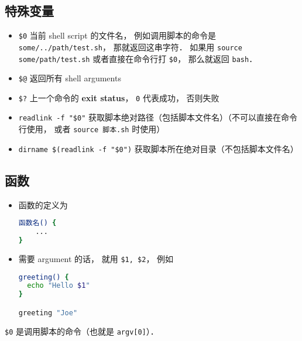 \subsection{特殊变量}
\begin{itemize}
\item \verb`$0` 当前 shell script 的文件名， 例如调用脚本的命令是 \verb|some/../path/test.sh|， 那就返回这串字符． 如果用 \verb|source some/path/test.sh| 或者直接在命令行打 \verb|$0|， 那么就返回 \verb|bash|．
\item \verb`$@` 返回所有 shell arguments
\item \verb|$?| 上一个命令的 \textbf{exit status}， \verb|0| 代表成功， 否则失败
\item \verb|readlink -f "$0"| 获取脚本绝对路径（包括脚本文件名）（不可以直接在命令行使用， 或者 \verb|source 脚本.sh| 时使用）
\item \verb|dirname $(readlink -f "$0")| 获取脚本所在绝对目录（不包括脚本文件名）
\end{itemize}

\subsection{函数}

\begin{itemize}
\item 函数的定义为
\begin{lstlisting}[language=bash]
函数名() {
	...
}
\end{lstlisting}
\item 需要 argument 的话， 就用 \verb|$1, $2|， 例如
\begin{lstlisting}[language=bash]
greeting() {
  echo "Hello $1"
}

greeting "Joe"
\end{lstlisting}
\end{itemize}

\verb|$0| 是调用脚本的命令（也就是 \verb|argv[0]|）．
